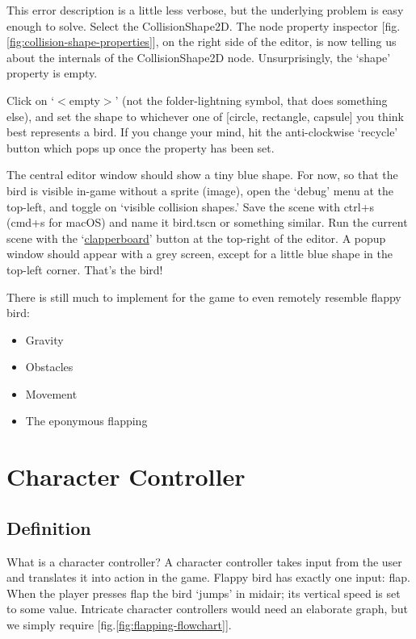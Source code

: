 \documentclass[14pt]{extarticle}
\newcommand{\prettyref}[2]{[{#1}.\ref{#2}]}
\begin{document}
This error description is a little less verbose, but the underlying problem is easy enough to solve. Select the CollisionShape2D. The node property inspector \prettyref{fig}{fig:collision-shape-properties}, on the right side of the editor, is now telling us about the internals of the CollisionShape2D node. Unsurprisingly, the `shape' property is empty.

Click on `$<$empty$>$' (not the folder-lightning symbol, that does something else), and set the shape to whichever one of [circle, rectangle, capsule] you think best represents a bird. If you change your mind, hit the anti-clockwise `recycle' button which pops up once the property has been set.


The central editor window should show a tiny blue shape. For now, so that the bird is visible in-game without a sprite (image), open the `debug' menu at the top-left, and toggle on `visible collision shapes.' Save the scene with ctrl+s (cmd+s for macOS) and name it bird.tscn or something similar. Run the current scene with the `\href{https://en.wikipedia.org/wiki/Clapperboard}{clapperboard}' button at the top-right of the editor. A popup window should appear with a grey screen, except for a little blue shape in the top-left corner. That's the bird!

There is still much to implement for the game to even remotely resemble flappy bird:
\begin{itemize}
  \item[--] Gravity
  \item[--] Obstacles
  \item[--] Movement
  \item[--] The eponymous flapping
\end{itemize}

\clearpage
\section{Character Controller}
\subsection*{Definition}
What is a character controller? A character controller takes input from the user and translates it into action in the game. Flappy bird has exactly one input: flap. When the player presses flap the bird `jumps' in midair; its vertical speed is set to some value. Intricate character controllers would need an elaborate graph, but we simply require \prettyref{fig}{fig:flapping-flowchart}.
\end{document}
